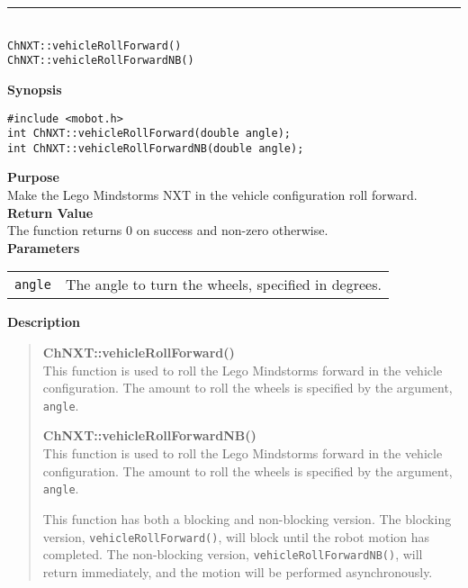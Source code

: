 \noindent
\vspace{5pt}
\rule{4.5in}{0.015in}\\
\noindent
{\LARGE \texttt{ChNXT::vehicleRollForward()}}\\
{\LARGE \texttt{ChNXT::vehicleRollForwardNB()}}\\
{}

\noindent
{\bf Synopsis}
\vspace{-8pt}
\begin{verbatim}
#include <mobot.h>
int ChNXT::vehicleRollForward(double angle);
int ChNXT::vehicleRollForwardNB(double angle);
\end{verbatim}

\noindent
{\bf Purpose}\\
Make the Lego Mindstorms NXT in the vehicle configuration roll forward.\\

\noindent
{\bf Return Value}\\
The function returns 0 on success and non-zero otherwise.\\

\noindent
{\bf Parameters}\\
\vspace{-0.1in}
\begin{description}
\item               
\begin{tabular}{p{15 mm}p{145 mm}}
\texttt{angle} & The angle to turn the wheels, specified in degrees.\\
\end{tabular}
\end{description}

\noindent
{\bf Description}\\
\vspace{-12pt}
\begin{quote}
{\bf ChNXT::vehicleRollForward()}\\
This function is used to roll the Lego Mindstorms forward in the vehicle
configuration. The amount to roll the wheels is specified by the argument,
\texttt{angle}.

{\bf ChNXT::vehicleRollForwardNB()}\\
This function is used to roll the Lego Mindstorms forward in the vehicle
configuration. The amount to roll the wheels is specified by the argument,
\texttt{angle}.

This function has both a blocking and non-blocking version.
The blocking version, \texttt{vehicleRollForward()}, will block until the
robot motion has completed. The non-blocking version, \texttt{vehicleRollForwardNB()},
will return immediately, and the motion will be performed asynchronously.\\
\end{quote}

